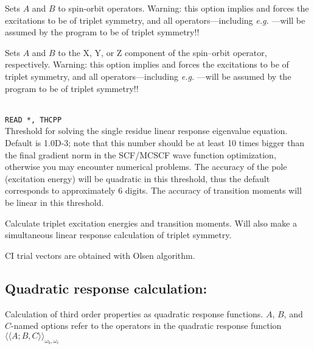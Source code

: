 \begin{description}
\item{}
Sets $A$ and $B$ to spin-orbit operators.
Warning: this option implies  and
forces the excitations to be of triplet symmetry,
and all operators---including
{\it e.g.\/} ---will be assumed by the program to be of triplet symmetry!!

\item{}
Sets $A$ and $B$ to the X, Y, or Z component of the spin--orbit
operator, respectively.
Warning: this option implies  and
forces the excitations to be of triplet symmetry,
and all operators---including
{\it e.g.\/} ---will be assumed by the program to be of triplet symmetry!!

\item{}\\
\verb|READ *, THCPP|\\
Threshold for solving the single residue linear response eigenvalue equation.
Default is 1.0D-3; note that this number should be at least 10 times
bigger than the final gradient norm in the SCF/MCSCF
wave function optimization, otherwise you may encounter
numerical problems.
The accuracy of the pole (excitation energy) will be
quadratic in this threshold, thus the default corresponds to approximately
6 digits. The accuracy of transition moments will be linear in this threshold.

\item{} Calculate triplet excitation energies and transition moments.
Will also make a simultaneous linear response calculation of triplet symmetry.

\item{}
CI trial vectors are obtained with Olsen algorithm.

\end{description}

\subsection{Quadratic response calculation: }

Calculation of third order properties
 as quadratic response
functions.
$A$, $B$, and $C$-named options refer to the operators in the quadratic
response function
$\langle\!\langle A;B,C \rangle\!\rangle_{\omega_b,\omega_c}$
\cite{ovhapjhjajthjojcp97,hhhjajpjjojcp97,haovhkpjthjcp98}

